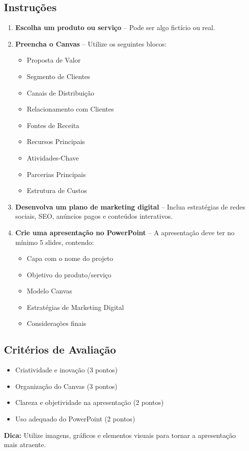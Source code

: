 \documentclass[a4paper,12pt]{article}
\begin{document}
\subsection*{Instruções}
\begin{enumerate}
    \item \textbf{Escolha um produto ou serviço} – Pode ser algo fictício ou real.
    \item \textbf{Preencha o Canvas} – Utilize os seguintes blocos:
    \begin{itemize}
        \item Proposta de Valor
        \item Segmento de Clientes
        \item Canais de Distribuição
        \item Relacionamento com Clientes
        \item Fontes de Receita
        \item Recursos Principais
        \item Atividades-Chave
        \item Parcerias Principais
        \item Estrutura de Custos
    \end{itemize}
    \item \textbf{Desenvolva um plano de marketing digital} – Inclua estratégias de redes sociais, SEO, anúncios pagos e conteúdos interativos.
    \item \textbf{Crie uma apresentação no PowerPoint} – A apresentação deve ter no mínimo 5 slides, contendo:
    \begin{itemize}
        \item Capa com o nome do projeto
        \item Objetivo do produto/serviço
        \item Modelo Canvas
        \item Estratégias de Marketing Digital
        \item Considerações finais
    \end{itemize}
\end{enumerate}

\subsection*{Critérios de Avaliação}
\begin{itemize}
    \item Criatividade e inovação (3 pontos)
    \item Organização do Canvas (3 pontos)
    \item Clareza e objetividade na apresentação (2 pontos)
    \item Uso adequado do PowerPoint (2 pontos)
\end{itemize}

\textbf{Dica:} Utilize imagens, gráficos e elementos visuais para tornar a apresentação mais atraente.
\end{document}
